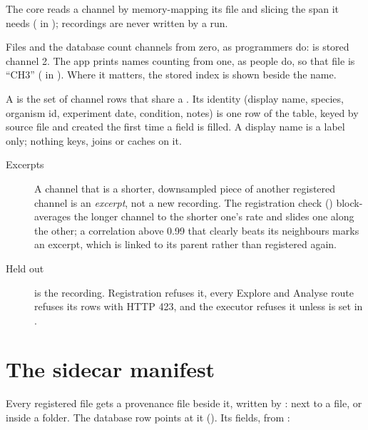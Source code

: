 The core reads a channel by memory-mapping its  file and slicing the span it needs
( in ); recordings are never written by a run.

\begin{plainterms}
Files and the database count channels from zero, as programmers do:  is stored channel
2. The app prints names counting from one, as people do, so that file is ``CH3''
( in ). Where it matters, the stored index is
shown beside the name.
\end{plainterms}

A  is the set of channel rows that share a . Its identity
(display name, species, organism id, experiment date, condition, notes) is one row of the
 table, keyed by source file and created the first time a field is filled. A display
name is a label only; nothing keys, joins or caches on it.

\begin{description}
\item[Excerpts] A channel that is a shorter, downsampled piece of another registered channel is an
  \emph{excerpt}, not a new recording. The registration check ()
  block-averages the longer channel to the shorter one's rate and slides one along the other; a
  correlation above 0.99 that clearly beats its neighbours marks an excerpt, which is linked to its
  parent rather than registered again.
\item[Held out]  is the  recording. Registration
  refuses it, every Explore and Analyse route refuses its rows with HTTP 423, and the executor
  refuses it unless  is set in .
\end{description}

\section{The sidecar manifest}\label{sec:data-manifest}
Every registered file gets a provenance file beside it, written by :
 next to a file, or  inside a
folder. The database row points at it (). Its fields, from
:


